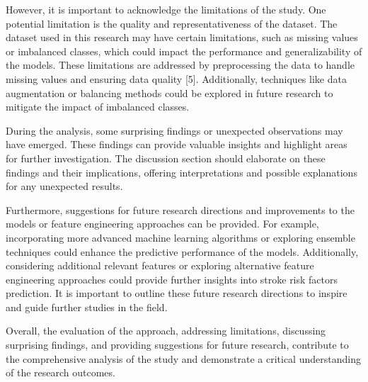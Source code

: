 \documentclass{article}
\begin{document}
However, it is important to acknowledge the limitations of the study. One potential limitation is the quality and representativeness of the dataset. The dataset used in this research may have certain limitations, such as missing values or imbalanced classes, which could impact the performance and generalizability of the models. These limitations are addressed by preprocessing the data to handle missing values and ensuring data quality [5]. Additionally, techniques like data augmentation or balancing methods could be explored in future research to mitigate the impact of imbalanced classes.

During the analysis, some surprising findings or unexpected observations may have emerged. These findings can provide valuable insights and highlight areas for further investigation. The discussion section should elaborate on these findings and their implications, offering interpretations and possible explanations for any unexpected results.

Furthermore, suggestions for future research directions and improvements to the models or feature engineering approaches can be provided. For example, incorporating more advanced machine learning algorithms or exploring ensemble techniques could enhance the predictive performance of the models. Additionally, considering additional relevant features or exploring alternative feature engineering approaches could provide further insights into stroke risk factors prediction. It is important to outline these future research directions to inspire and guide further studies in the field.

Overall, the evaluation of the approach, addressing limitations, discussing surprising findings, and providing suggestions for future research, contribute to the comprehensive analysis of the study and demonstrate a critical understanding of the research outcomes.


\nocite{*}
\printbibliography
\end{document}
